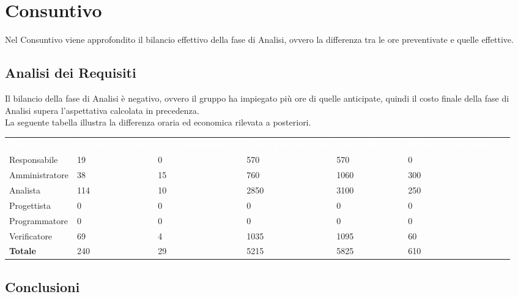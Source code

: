 \section{Consuntivo}

Nel Consuntivo viene approfondito il bilancio effettivo della fase di Analisi, ovvero la differenza tra le ore preventivate e quelle effettive.

\subsection{Analisi dei Requisiti}

Il bilancio della fase di Analisi è negativo, ovvero il gruppo ha impiegato più ore di quelle anticipate, quindi il costo finale della fase di Analisi supera l'aspettativa calcolata in precedenza.\\
La seguente tabella illustra la differenza oraria ed economica rilevata a posteriori.

\renewcommand{\arraystretch}{2}

\begin{longtable}{ C{2.5cm} C{2.5cm} C{2.5cm} C{2.5cm} C{2.5cm} C{2.5cm} C{2.5cm} C{2.5cm}}
	\textcolor{white}{\textbf{Ruolo}} & \textcolor{white}{\textbf{Ore preventivate}} & \textcolor{white}{\textbf{Ore supplementari}} & \textcolor{white}{\textbf{Costo preventivato}} & \textcolor{white}{\textbf{Costo effettivo}} & \textcolor{white}{\textbf{Differenza di costo}}\\	
	
	Responsabile & 19 & 0 & 570 & 570 & 0 \\
	Amministratore & 38 & 15 & 760 & 1060 & 300 \\
	Analista & 114 & 10 & 2850 & 3100 & 250 \\
	Progettista & 0 & 0 & 0 & 0 & 0 \\
	Programmatore & 0 & 0 & 0 & 0 & 0 \\
	Verificatore & 69 & 4 & 1035 & 1095 & 60 \\
	\textbf{Totale} & 240 & 29 & 5215 & 5825 & 610 \\	
	
\end{longtable}

\subsection{Conclusioni}

